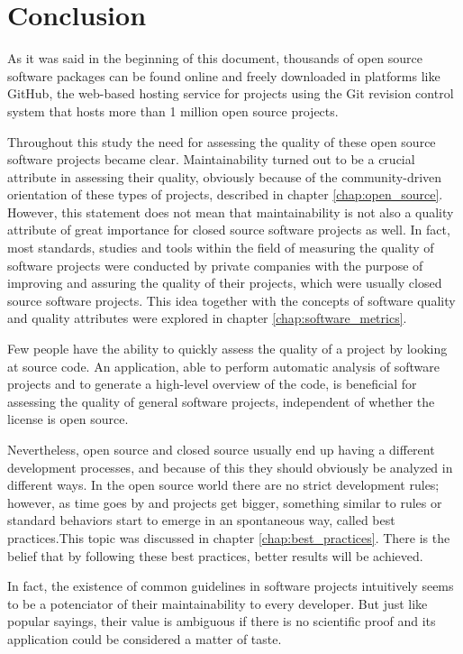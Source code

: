 \thispagestyle{empty}
\chapter{Conclusion}\label{chap:conclusion}


As it was said in the beginning of this document, thousands of open source software packages can be found online and 
freely downloaded in platforms like GitHub,
the web-based hosting service for projects using the Git revision control system that 
hosts more than 1 million open source projects.

Throughout this study the need for assessing the quality of these open source software projects became clear.
Maintainability turned out to be a crucial attribute in assessing their quality, 
obviously because of the community-driven orientation of these types of projects, 
described in chapter \ref{chap:open_source}. 
However, this statement does not mean that maintainability is not also a quality attribute of great importance
for closed source software projects as well. 
In fact, most standards, studies and tools within the field of measuring the quality of software projects 
were conducted by private companies with the purpose of improving and assuring the quality of their projects,
which were usually closed source software projects. This idea together with the concepts of software quality and 
quality attributes were explored in chapter \ref{chap:software_metrics}.

Few people have the ability to quickly assess the quality of a project by looking at source code. 
An application, able to perform automatic analysis of software projects and to generate a high-level overview of the code,
is beneficial for assessing the quality of general software projects, independent of whether the license is open source.

Nevertheless, open source and closed source usually end up having a different development processes, and 
because of this they should obviously be analyzed in different ways.
In the open source world there are no strict development rules; 
however, as time goes by and projects get bigger, something similar to rules
or standard behaviors start to emerge in an spontaneous way, called best practices.This topic was discussed in chapter \ref{chap:best_practices}.
There is the belief that by following these best practices, better results will be achieved.

In fact, the existence of common guidelines in software projects intuitively seems to be a potenciator of their 
maintainability to every developer.
But just like popular sayings, their value is ambiguous if there is no scientific proof and 
its application could be considered a matter of taste.

